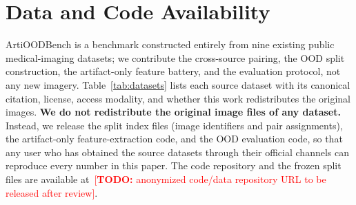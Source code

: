 \documentclass{article}
\providecommand{\todo}[1]{\textcolor{red}{[\textbf{TODO:} #1]}}
\begin{document}
\section{Data and Code Availability}

ArtiOODBench is a benchmark constructed entirely from nine existing public
medical-imaging datasets; we contribute the cross-source pairing, the OOD split
construction, the artifact-only feature battery, and the evaluation protocol, not
any new imagery. Table~\ref{tab:datasets} lists each source dataset with its
canonical citation, license, access modality, and whether this work
redistributes the original images. \textbf{We do not redistribute the original
image files of any dataset.} Instead, we release the split index files (image
identifiers and pair assignments), the artifact-only feature-extraction code, and
the OOD evaluation code, so that any user who has obtained the source datasets
through their official channels can reproduce every number in this paper. The
code repository and the frozen split files are available
at~\todo{anonymized code/data repository URL to be released after review}.
\end{document}

